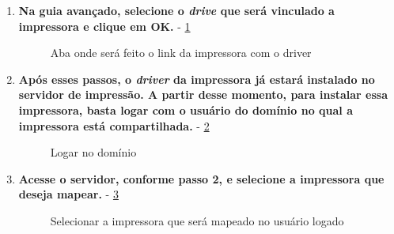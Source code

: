 \begin{enumerate}
	\item \textbf{Na guia avançado, selecione o \textit{drive} que será vinculado a impressora e clique em OK.} - \ref{aba_avancado}
	\begin{figure}[ht]
	   	\centering
	   	\caption{Aba onde será feito o link da impressora com o driver}
	    \label{aba_avancado}
	\end{figure}
	
		\pagebreak
		
	\item \textbf{Após esses passos, o \textit{driver} da impressora já estará instalado no servidor de impressão. A partir desse momento, para instalar essa impressora, basta logar com o usuário do domínio no qual a impressora está compartilhada.} - \ref{login_dominio}
	\begin{figure}[ht]
	   	\centering
	   	\caption{Logar no domínio}
	    \label{login_dominio}
	\end{figure}
	
	
	\item \textbf{Acesse o servidor, conforme passo 2, e selecione a impressora que deseja mapear.} - \ref{selecionar_impressora_servidor}
	\begin{figure}[ht]
	   	\centering
	   	\caption{Selecionar a impressora que será mapeado no usuário logado}
	    \label{selecionar_impressora_servidor}
	\end{figure}
	

\end{enumerate}
